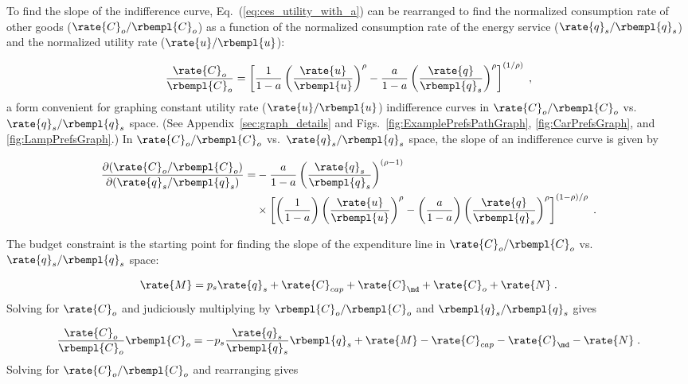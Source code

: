 To find the slope of the indifference curve,
Eq.~(\ref{eq:ces_utility_with_a}) can be rearranged to find 
the normalized consumption rate of other goods ($\rate{C}_o/\rbempl{C}_o$)
as a function of the normalized consumption rate of the energy service
($\rate{q}_s/\rbempl{q}_s$)
and the normalized utility rate ($\rate{u}/\rbempl{u}$):

\begin{equation} \label{eq:utility_Co_form}
  \frac{\rate{C}_o}{\rbempl{C}_o} = 
      \left[ \frac{1}{1 - a} \left( \frac{\rate{u}}{\rbempl{u}} \right)^\rho 
            - \frac{a}{1 - a} \left( \frac{\rate{q}}{\rbempl{q}_s} \right)^\rho \right]^{(1/\rho)} \; ,
\end{equation}
%
a form convenient for graphing 
constant utility rate ($\rate{u}/\rbempl{u}$) indifference curves in 
$\rate{C}_o/\rbempl{C}_o$ vs.\ 
$\rate{q}_s/\rbempl{q}_s$ space.
(See Appendix~\ref{sec:graph_details} and
Figs.~\ref{fig:ExamplePrefsPathGraph}, 
\ref{fig:CarPrefsGraph}, and 
\ref{fig:LampPrefsGraph}.)
In $\rate{C}_o/\rbempl{C}_o$ vs.\ $\rate{q}_s/\rbempl{q}_s$ space, 
the slope of an indifference curve is given by 

\begin{align} \label{eq:slope_indifference_curve}
  \frac{\partial (\rate{C}_o/\rbempl{C}_o)}{\partial (\rate{q}_s/\rbempl{q}_s)} =&
        -\frac{a}{1 - a} \left( \frac{\rate{q}_s}{\rbempl{q}_s} \right)^{(\rho -1)} \nonumber  \\
        &\times \left[ \left( \frac{1}{1 - a} \right) \left( \frac{\rate{u}}{\rbempl{u}} \right)^\rho
                - \left( \frac{a}{1 - a} \right) 
                          \left( \frac{\rate{q}}{\rbempl{q}_s} \right)^\rho \right]^{(1 - \rho)/\rho} \; .
\end{align}

The budget constraint is the starting point for finding 
the slope of the expenditure line in 
$\rate{C}_o/\rbempl{C}_o$ vs.\ $\rate{q}_s/\rbempl{q}_s$ space:

\begin{equation}
  \rate{M} = p_s \rate{q}_s + \rate{C}_{cap} + \rate{C}_{\md} + \rate{C}_o  + \rate{N} \; . 
\end{equation}
%
Solving for $\rate{C}_o$ and judiciously multiplying by $\rbempl{C}_o/\rbempl{C}_o$
and $\rbempl{q}_s/\rbempl{q}_s$ gives

\begin{equation}
  \frac{\rate{C}_o}{\rbempl{C}_o} \rbempl{C}_o = - p_s \frac{\rate{q}_s}{\rbempl{q}_s} \rbempl{q}_s
                        + \rate{M} - \rate{C}_{cap} - \rate{C}_{\md}  - \rate{N} \; .
\end{equation}
%
Solving for $\rate{C}_o/\rbempl{C}_o$ and rearranging gives

